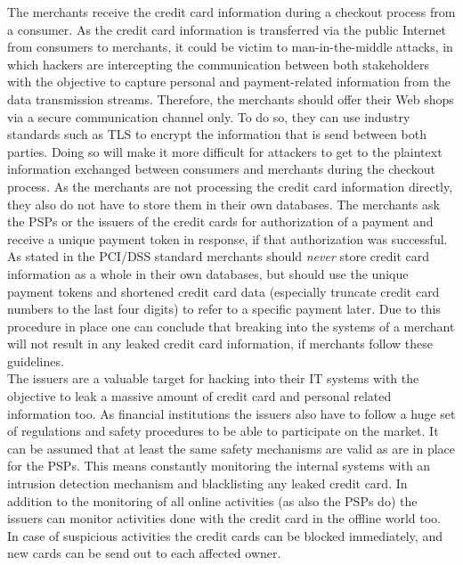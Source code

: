 The merchants receive the credit card information during a checkout process from a consumer. As the credit card information is transferred via the public Internet from consumers to merchants, it could be victim to man-in-the-middle attacks, in which hackers are intercepting the communication between both stakeholders with the objective to capture personal and payment-related information from the data transmission streams. Therefore, the merchants should offer their Web shops via a secure communication channel only. To do so, they can use industry standards such as \gls{TLS} to encrypt the information that is send between both parties. Doing so will make it more difficult for attackers to get to the plaintext information exchanged between consumers and merchants during the checkout process. As the merchants are not processing the credit card information directly, they also do not have to store them in their own databases. The merchants ask the \gls{PSP}s or the issuers of the credit cards for authorization of a payment and receive a unique payment token in response, if that authorization was successful. As stated in the \gls{PCI/DSS} standard \citep{virtue2009payment} merchants should \emph{never} store credit card information as a whole in their own databases, but should use the unique payment tokens and shortened credit card data (especially truncate credit card numbers to the last four digits) to refer to a specific payment later. Due to this procedure in place one can conclude that breaking into the systems of a merchant will not result in any leaked credit card information, if merchants follow these guidelines. \\

The issuers are a valuable target for hacking into their \gls{IT} systems with the objective to leak a massive amount of credit card and personal related information too. As financial institutions the issuers also have to follow a huge set of regulations and safety procedures to be able to participate on the market. It can be assumed that at least the same safety mechanisms are valid as are in place for the \gls{PSP}s. This means constantly monitoring the internal systems with an intrusion detection mechanism and blacklisting any leaked credit card. In addition to the monitoring of all online activities (as also the \gls{PSP}s do) the issuers can monitor activities done with the credit card in the offline world too. In case of suspicious activities the credit cards can be blocked immediately, and new cards can be send out to each affected owner. \\

